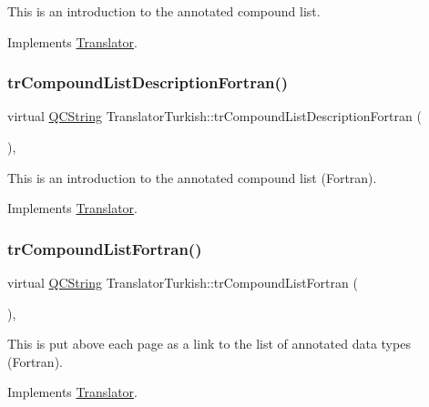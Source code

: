 This is an introduction to the annotated compound list. 

Implements \mbox{\hyperlink{class_translator}{Translator}}.

\mbox{\label{class_translator_turkish_acf8db23b1dcc5852d507739c17d38bf7}} 
\subsubsection{\texorpdfstring{trCompoundListDescriptionFortran()}{trCompoundListDescriptionFortran()}}
{\footnotesize\ttfamily virtual \mbox{\hyperlink{class_q_c_string}{Q\+C\+String}} Translator\+Turkish\+::tr\+Compound\+List\+Description\+Fortran (\begin{DoxyParamCaption}{ }\end{DoxyParamCaption})\hspace{0.3cm}{\ttfamily [inline]}, {\ttfamily [virtual]}}

This is an introduction to the annotated compound list (Fortran). 

Implements \mbox{\hyperlink{class_translator}{Translator}}.

\mbox{\label{class_translator_turkish_a9ad8f46d63a96a3885dc789ef5333e2c}} 
\subsubsection{\texorpdfstring{trCompoundListFortran()}{trCompoundListFortran()}}
{\footnotesize\ttfamily virtual \mbox{\hyperlink{class_q_c_string}{Q\+C\+String}} Translator\+Turkish\+::tr\+Compound\+List\+Fortran (\begin{DoxyParamCaption}{ }\end{DoxyParamCaption})\hspace{0.3cm}{\ttfamily [inline]}, {\ttfamily [virtual]}}

This is put above each page as a link to the list of annotated data types (Fortran). 

Implements \mbox{\hyperlink{class_translator}{Translator}}.


